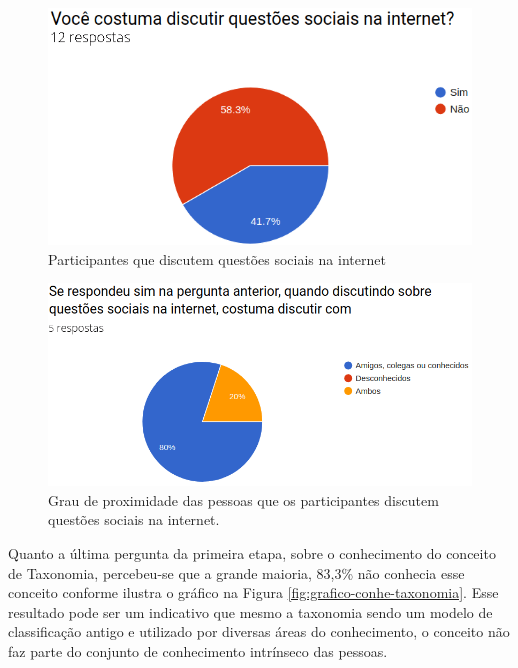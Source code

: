 \begin{figure}[!ht]
    \centering
    \includegraphics[scale=0.4]{./figuras/discutir.png}
    \caption{Participantes que discutem questões sociais na internet}
    \label{fig:grafico-discu}
\end{figure}

\begin{figure}[!ht]
    \centering
    \includegraphics[scale=0.4]{./figuras/discutir_com.png}
    \caption{Grau de proximidade das pessoas que os participantes discutem questões sociais na internet.}
    \label{fig:grafico-discu-alvo}
\end{figure}
\pagebreak

\par
Quanto a última pergunta da primeira etapa, sobre o conhecimento do conceito de Taxonomia, percebeu-se que a grande maioria, 83,3\% não conhecia esse conceito conforme ilustra 
o gráfico na Figura \ref{fig:grafico-conhe-taxonomia}. Esse resultado pode ser um indicativo que mesmo a taxonomia sendo um modelo de classificação antigo e utilizado por diversas 
áreas do conhecimento, o conceito não faz parte do conjunto de conhecimento intrínseco das pessoas.

